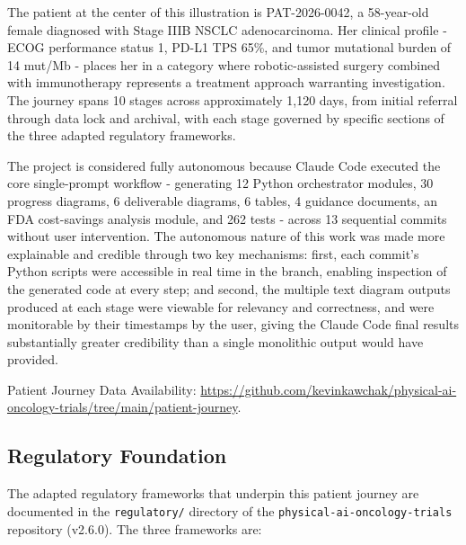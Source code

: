 \documentclass{article}
\begin{document}
The patient at the center of this illustration is PAT-2026-0042, a 58-year-old female diagnosed with Stage IIIB NSCLC adenocarcinoma. Her clinical profile - ECOG performance status 1, PD-L1 TPS 65\%, and tumor mutational burden of 14 mut/Mb - places her in a category where robotic-assisted surgery combined with immunotherapy represents a treatment approach warranting investigation. The journey spans 10 stages across approximately 1,120 days, from initial referral through data lock and archival, with each stage governed by specific sections of the three adapted regulatory frameworks.

The project is considered fully autonomous because Claude Code executed the core single-prompt workflow - generating 12 Python orchestrator modules, 30 progress diagrams, 6 deliverable diagrams, 6 tables, 4 guidance documents, an FDA cost-savings analysis module, and 262 tests - across 13 sequential commits without user intervention. The autonomous nature of this work was made more explainable and credible through two key mechanisms: first, each commit's Python scripts were accessible in real time in the branch, enabling inspection of the generated code at every step; and second, the multiple text diagram outputs produced at each stage were viewable for relevancy and correctness, and were monitorable by their timestamps by the user, giving the Claude Code final results substantially greater credibility than a single monolithic output would have provided.

Patient Journey Data Availability: \url{https://github.com/kevinkawchak/physical-ai-oncology-trials/tree/main/patient-journey}.
 

\tableofcontents

\newpage

\subsection{Regulatory Foundation}

The adapted regulatory frameworks that underpin this patient journey are documented in the \texttt{regulatory/} directory of the \texttt{physical-ai-oncology-trials} repository (v2.6.0). The three frameworks are:
\end{document}
